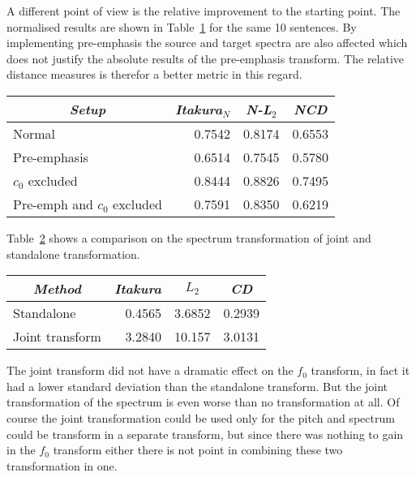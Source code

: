 A different point of view is the relative improvement to the starting point. The normalised results are shown in Table~\ref{tab:normalized_results} for the same 10 sentences. By implementing pre-emphasis the source and target spectra are also affected which does not justify the absolute results of the pre-emphasis transform. The relative distance measures is therefor a better metric in this regard.
\begin{table}[htbp]
	\begin{center}
		\label{tab:normalized_results}
		\begin{tabular}{lrrr}
			\toprule
			\multicolumn{1}{c}{\emph{Setup}} & \multicolumn{1}{c}{\emph{Itakura$_N$}} & \multicolumn{1}{c}{\emph{N-L$_2$}} & \multicolumn{1}{c}{\emph{NCD}}\\
			\midrule
			Normal & 0.7542 & 0.8174 & 0.6553 \\
			Pre-emphasis &  0.6514 & 0.7545 & 0.5780 \\
			$c_0$ excluded & 0.8444 & 0.8826 & 0.7495 \\
			Pre-emph and $c_0$ excluded & 0.7591 & 0.8350 & 0.6219 \\
			\bottomrule			
		\end{tabular}		
	\end{center}	
\end{table}

Table~\ref{tab:spectrum_joint_transform} shows a comparison on the spectrum transformation of joint and standalone transformation.
\begin{table}[htbp]
	\begin{center}
		\label{tab:spectrum_joint_transform}
		\begin{tabular}{lrrr}
			\toprule
			\multicolumn{1}{c}{\emph{Method}} & \multicolumn{1}{c}{\emph{Itakura}} & \multicolumn{1}{c}{\emph{$L_2$}} & \multicolumn{1}{c}{\emph{CD}}\\
			\midrule
			Standalone & 0.4565 & 3.6852 & 0.2939 \\
			Joint transform & 3.2840 & 10.157 & 3.0131 \\
			\bottomrule			
		\end{tabular}		
	\end{center}	
\end{table}
The joint transform did not have a dramatic effect on the $f_0$ transform, in fact it had a lower standard deviation than the standalone transform. But the joint transformation of the spectrum is even worse than no transformation at all. Of course the joint transformation could be used only for the pitch and spectrum could be transform in a separate transform, but since there was nothing to gain in the $f_0$ transform either there is not point in combining these two transformation in one.

